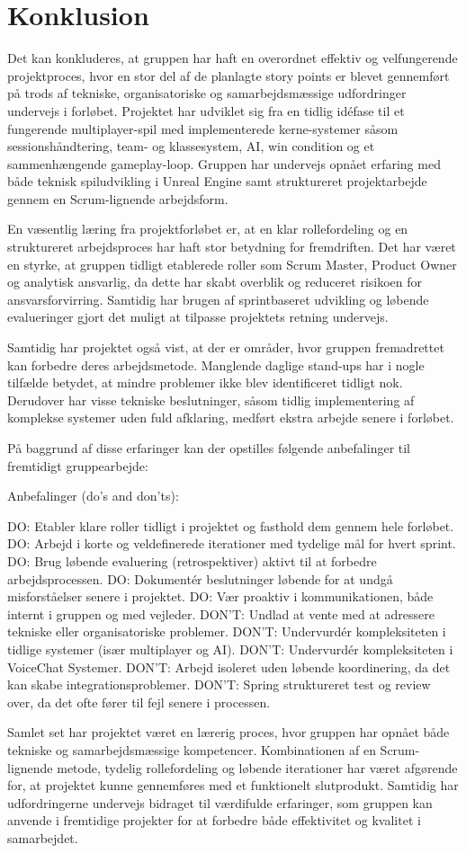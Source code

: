 \section{Konklusion}
Det kan konkluderes, at gruppen har haft en overordnet effektiv og velfungerende projektproces, hvor en stor del af de planlagte story points er blevet gennemført på trods af tekniske, organisatoriske og samarbejdsmæssige udfordringer undervejs i forløbet. Projektet har udviklet sig fra en tidlig idéfase til et fungerende multiplayer-spil med implementerede kerne-systemer såsom sessionshåndtering, team- og klassesystem, AI, win condition og et sammenhængende gameplay-loop. Gruppen har undervejs opnået erfaring med både teknisk spiludvikling i Unreal Engine samt struktureret projektarbejde gennem en Scrum-lignende arbejdsform.

En væsentlig læring fra projektforløbet er, at en klar rollefordeling og en struktureret arbejdsproces har haft stor betydning for fremdriften. Det har været en styrke, at gruppen tidligt etablerede roller som Scrum Master, Product Owner og analytisk ansvarlig, da dette har skabt overblik og reduceret risikoen for ansvarsforvirring. Samtidig har brugen af sprintbaseret udvikling og løbende evalueringer gjort det muligt at tilpasse projektets retning undervejs.

Samtidig har projektet også vist, at der er områder, hvor gruppen fremadrettet kan forbedre deres arbejdsmetode. Manglende daglige stand-ups har i nogle tilfælde betydet, at mindre problemer ikke blev identificeret tidligt nok. Derudover har visse tekniske beslutninger, såsom tidlig implementering af komplekse systemer uden fuld afklaring, medført ekstra arbejde senere i forløbet.

På baggrund af disse erfaringer kan der opstilles følgende anbefalinger til fremtidigt gruppearbejde:

Anbefalinger (do’s and don’ts):

DO: Etabler klare roller tidligt i projektet og fasthold dem gennem hele forløbet.
DO: Arbejd i korte og veldefinerede iterationer med tydelige mål for hvert sprint.
DO: Brug løbende evaluering (retrospektiver) aktivt til at forbedre arbejdsprocessen.
DO: Dokumentér beslutninger løbende for at undgå misforståelser senere i projektet.
DO: Vær proaktiv i kommunikationen, både internt i gruppen og med vejleder.
DON’T: Undlad at vente med at adressere tekniske eller organisatoriske problemer.
DON’T: Undervurdér kompleksiteten i tidlige systemer (især multiplayer og AI).
DON’T: Undervurdér kompleksiteten i VoiceChat Systemer.
DON’T: Arbejd isoleret uden løbende koordinering, da det kan skabe integrationsproblemer.
DON’T: Spring struktureret test og review over, da det ofte fører til fejl senere i processen.

Samlet set har projektet været en lærerig proces, hvor gruppen har opnået både tekniske og samarbejdsmæssige kompetencer. Kombinationen af en Scrum-lignende metode, tydelig rollefordeling og løbende iterationer har været afgørende for, at projektet kunne gennemføres med et funktionelt slutprodukt. Samtidig har udfordringerne undervejs bidraget til værdifulde erfaringer, som gruppen kan anvende i fremtidige projekter for at forbedre både effektivitet og kvalitet i samarbejdet.